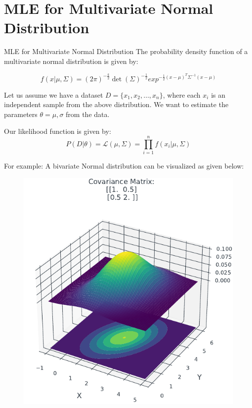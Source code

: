 \documentclass[handout]{beamer}
\begin{document}
    \section{MLE for Multivariate Normal Distribution}
\begin{frame}{MLE for Multivariate Normal Distribution}
The probability density function of a multivariate normal distribution is given by:

\begin{equation}
f(x|\mu, \Sigma) = (2\pi)^{-\frac{k}{2}}\det(\Sigma)^{-\frac{1}{2}}exp^{-\frac{1}{2}(x-\mu)^{T}\Sigma^{-1}(x-\mu)}
\end{equation}

Let us assume we have a dataset $D = \{x_1, x_2, \ldots, x_n\}$, where each $x_i$ is an independent sample from the above distribution.
We want to estimate the parameters $\theta = {\mu, \sigma}$ from the data.

Our likelihood function is given by:
\begin{equation}
P(D|\theta) = \mathcal{L}(\mu, \Sigma) = \prod_{i=1}^n f(x_i|\mu, \Sigma)
\end{equation}

\end{frame}

\begin{frame}
    For example: A bivariate Normal distribution can be visualized as given below:
    \begin{figure}
                \centerline{\includegraphics[scale = 0.75]{../figures/mle/bivariate_normal.pdf}}
\end{figure}
    
\end{frame}
\end{document}
